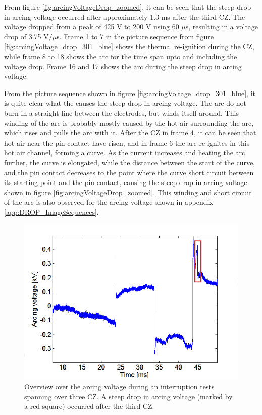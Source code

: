 \documentclass[10pt,b5paper,twoside]{article}
\begin{document}
From figure \ref{fig:arcingVoltageDrop_zoomed}, it can be seen that the steep drop in arcing voltage occurred after approximately 1.3 ms after the third CZ. The voltage dropped from a peak of 425 V to 200 V using 60 $\mu$s, resulting in a voltage drop of 3.75 V$/  \mu$s. Frame 1 to 7 in the picture sequence from figure \ref{fig:arcingVoltage_drop_301_blue} shows the thermal re-ignition during the CZ, while frame 8 to 18 shows the arc for the time span upto and including the voltage drop. Frame 16 and 17 shows the arc during the steep drop in arcing voltage. 

From the picture sequence shown in figure \ref{fig:arcingVoltage_drop_301_blue}, it is quite clear what the causes the steep drop in arcing voltage. The arc do not burn in a straight line between the electrodes, but winds itself around. This winding of the arc is probably mostly caused by the hot air surrounding the arc, which rises and pulls the arc with it. After the CZ in frame 4, it can be seen that hot air near the pin contact have risen, and in frame 6 the arc re-ignites in this hot air channel, forming a curve. As the current increases and heating the arc further, the curve is elongated, while the distance between the start of the curve, and the pin contact decreases to the point where the curve short circuit between its starting point and the pin contact, causing the steep drop in arcing voltage shown in figure \ref{fig:arcingVoltageDrop_zoomed}. This winding and short circuit of the arc is also observed for the arcing voltage shown in appendix \ref{app:DROP_ImageSequences}.

 

\begin{figure}[H]
\centering
\includegraphics[scale=0.6, angle =0 ]{Bilder/Results/overviewArcingVoltageDrop.PNG}
\caption{Overview over the arcing voltage during an interruption tests spanning over three CZ. A steep drop in arcing voltage (marked by a red square) occurred after the third CZ.} \label{fig:arcingVoltageDrop}
\end{figure}
\end{document}
